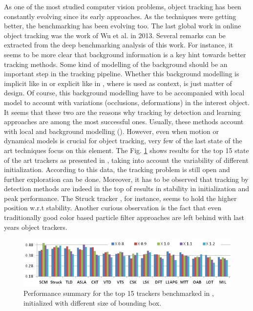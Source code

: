 As one of the most studied computer vision problems, object tracking has been constantly evolving since its early approaches. 
As the techniques were getting better, the benchmarking has been evolving too. The last global work in online object tracking 
was the work of Wu et al. \cite{c16} in 2013. Several remarks can be extracted from the deep benchmarking analysis of this work. 
For instance, it seems to be more clear that background information is a key hint towards 
better tracking methods. Some kind of modelling of the background should be an important 
step in the tracking pipeline. Whether this background modelling is implicit like in \cite{c23} or 
explicit like in \cite{c22}, where is used as context, is just matter of design. Of course, this 
background modelling have to be accompanied with local model to account with variations (occlusions, deformations) in the interest object. 
It seems that these two are the reasons why tracking by detection and learning approaches are among the most successful ones. Usually, 
these methods account with local and background modelling (\cite{c22}\cite{c23}\cite{c24}\cite{c25}\cite{c26}). 
However, even when motion or dynamical models is crucial for object tracking, very few of the last state of the art techniques focus on this 
element. The Fig. \ref{tr_per} shows results for the top 15 state of the art trackers as presented in \cite{c16}, taking into account 
the variability of different initialization. According to this data, the tracking problem is still open and further exploration can be done. 
Moreover, it has to be observed that tracking by detection methods are indeed in the top of results in stability in initialization and peak performance. 
The Struck tracker \cite{c23}, for instance, seems to hold the higher position w.r.t stability. Another curious observation is the fact that even traditionally good color based particle filter approaches are left behind with last years object trackers.

   \begin{figure}[thpb]
      \centering
      \includegraphics[width=1.0\textwidth]{../images/trackers_performance.png}
      \caption{ Performance summary for the top 15 trackers benchmarked in \cite{c16}, initialized with different size of bounding box. }
      \label{tr_per}
   \end{figure}

